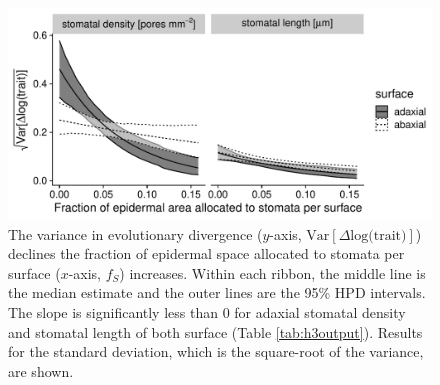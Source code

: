 \documentclass[
  12pt,
]{article}
\begin{document}
\begin{figure}[ht]
\includegraphics[width=\textwidth]{../figures/fs-sigma.pdf}
\caption{The variance in evolutionary divergence ($y$-axis, $\textrm{Var}[\Delta \textrm{log(trait)}]$) declines the fraction of epidermal space allocated to stomata per surface ($x$-axis, $f_S$) increases. Within each ribbon, the middle line is the median estimate and the outer lines are the 95\% HPD intervals. The slope is significantly less than 0 for adaxial stomatal density and stomatal length of both surface (Table \ref{tab:h3output}). Results for the standard deviation, which is the square-root of the variance, are shown.}
\label{fig:fs-sigma}
\end{figure}
\end{document}
